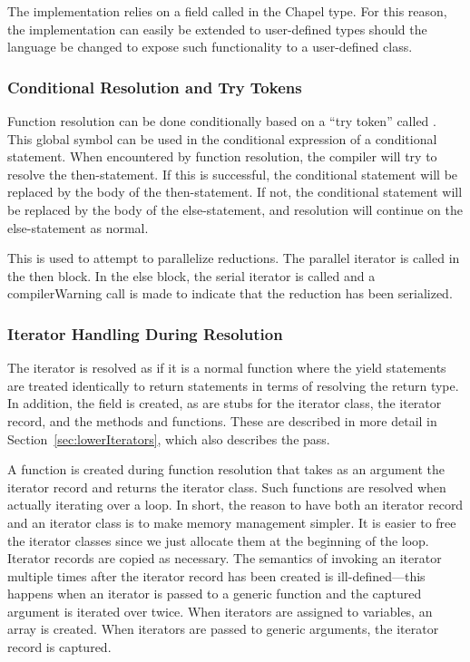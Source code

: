 \documentclass[10pt]{article}
\begin{document}
The implementation relies on a field called  in
the Chapel type.  For this reason, the implementation can easily be
extended to user-defined types should the language be changed to
expose such functionality to a user-defined class.

\subsubsection{Conditional Resolution and Try Tokens}

Function resolution can be done conditionally based on a ``try token''
called .  This global symbol can be used in the
conditional expression of a conditional statement.  When encountered
by function resolution, the compiler will try to resolve the
then-statement.  If this is successful, the conditional statement will
be replaced by the body of the then-statement.  If not, the
conditional statement will be replaced by the body of the
else-statement, and resolution will continue on the else-statement as
normal.

This is used to attempt to parallelize reductions.  The parallel
iterator is called in the then block.  In the else block, the serial
iterator is called and a compilerWarning call is made to indicate that
the reduction has been serialized.

\subsubsection{Iterator Handling During Resolution}
\label{sec:resolveiter}

The iterator is resolved as if it is a normal function where the yield
statements are treated identically to return statements in terms of
resolving the return type.  In addition, the  field
is created, as are stubs for the iterator class, the iterator record,
and the methods and functions.  These are described in more detail in
Section~\ref{sec:lowerIterators}, which also describes the
 pass.

A function  is created during function resolution
that takes as an argument the iterator record and returns the iterator
class.  Such functions are resolved when actually iterating over a
loop.  In short, the reason to have both an iterator record and an
iterator class is to make memory management simpler.  It is easier to
free the iterator classes since we just allocate them at the beginning
of the loop.  Iterator records are copied as necessary.  The semantics
of invoking an iterator multiple times after the iterator record has
been created is ill-defined---this happens when an iterator is passed
to a generic function and the captured argument is iterated over
twice.  When iterators are assigned to variables, an array is created.
When iterators are passed to generic arguments, the iterator record is
captured.
\end{document}
